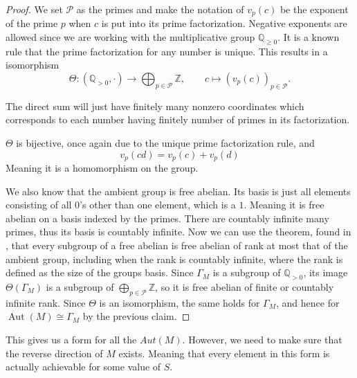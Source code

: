 \documentclass[11pt]{scrartcl}
\begin{document}
\begin{soln}
    \begin{proof}
		We set $\mathcal P$ as the primes 
		and make the notation of $v_p(c)$ be the exponent of the prime $p$
		when $c$ is put into its prime factorization. Negative exponents are allowed
		since we are working with the multiplicative group $\mathbb{Q}_{\geq0}$. It is a known
		rule that the prime factorization for any number is unique. This results
		in a isomorphism 
        \[
        \Theta:(\mathbb Q_{>0},\cdot)
        \longrightarrow
        \bigoplus_{p\in\mathcal P}\mathbb Z,
        \qquad
        c\longmapsto (v_p(c))_{p\in\mathcal P}.
        \]

		The direct sum will just have finitely many nonzero coordinates which 
		corresponds to each number having finitely number of primes in its factorization.

        $\Theta$ is bijective, once again due to the unique prime factorization
		rule, and
        \[
        v_p(cd)=v_p(c)+v_p(d)
        \]
        Meaning it is a homomorphism on the group.
		
		We also know that the ambient group is free abelian. Its basis is just all elements consisting 
		of all $0$'s other than one element, which is a $1$. Meaning it
		is free abelian on a basis indexed by the primes. There are countably infinite many primes, thus 
        its basis is countably infinite.
		Now we can use the theorem, found in 
        \cite[Theorem~13.6]{p6-drutu-kapovich}, that every subgroup of a free
		abelian is
        free abelian of rank at most that of the ambient group,
        including when the rank is countably infinite, where the rank is defined as
		the size of the groups basis. Since $\Gamma_M$ is a subgroup of $\mathbb Q_{>0}$, its image
$\Theta(\Gamma_M)$ is a subgroup of
$\bigoplus_{p\in\mathcal P}\mathbb Z$, so it is free abelian of
finite or countably infinite rank.
         Since $\Theta$ is an isomorphism,
the same holds for $\Gamma_M$, and hence for
$\operatorname{Aut}(M)\cong\Gamma_M$ by the previous claim.
    \end{proof}
	This gives us a form for all the $Aut(M)$. However, we need to make sure that
	the reverse direction of $M$ exists. Meaning that every element in this form is 
	actually achievable for some value of $S$. 

    \subsubsection*{}


\end{soln}
\end{document}
